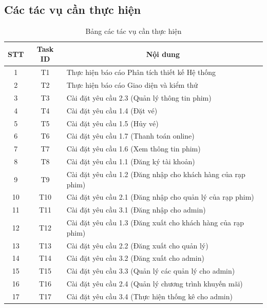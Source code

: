 \documentclass[a4paper, 12pt]{article}
\begin{document}
    \subsection{Các tác vụ cần thực hiện}
    \begin{table}[H]
        \begin{center}
            \begin{tabular}{|c|c|l|}
            \hline
            STT & Task ID & \multicolumn{1}{c|}{Nội dung}                               \\ \hline
            1   & T1      & Thực hiện báo cáo Phân tích thiết kế Hệ thống               \\ \hline
            2   & T2      & Thực hiện báo cáo Giao diện và kiểm thử                     \\ \hline
            3   & T3      & Cài đặt yêu cầu 2.3 (Quản lý thông tin phim)                \\ \hline
            4   & T4      & Cài đặt yêu cầu 1.4 (Đặt vé)                                \\ \hline
            5   & T5      & Cài đặt yêu cầu 1.5 (Hủy vé)                                \\ \hline
            6   & T6      & Cài đặt yêu cầu 1.7 (Thanh toán online)                     \\ \hline
            7   & T7      & Cài đặt yêu cầu 1.6 (Xem thông tin phim)                    \\ \hline
            8   & T8      & Cài đặt yêu cầu 1.1 (Đăng ký tài khoản)                     \\ \hline
            9   & T9      & Cài đặt yêu cầu 1.2 (Đăng nhập cho khách hàng của rạp phim) \\ \hline
            10  & T10     & Cài đặt yêu cầu 2.1 (Đăng nhập cho quản lý của rạp phim)    \\ \hline
            11  & T11     & Cài đặt yêu cầu 3.1 (Đăng nhập cho admin)                   \\ \hline
            12  & T12     & Cài đặt yêu cầu 1.3 (Đăng xuất cho khách hàng của rạp phim) \\ \hline
            13  & T13     & Cài đặt yêu cầu 2.2 (Đăng xuất cho quản lý)                 \\ \hline
            14  & T14     & Cài đặt yêu cầu 3.2 (Đăng xuất cho admin)                   \\ \hline
            15  & T15     & Cài đặt yêu cầu 3.3 (Quản lý các quản lý cho admin)         \\ \hline
            16  & T16     & Cài đặt yêu cầu 2.4 (Quản lý chương trình khuyến mãi)       \\ \hline
            17  & T17     & Cài đặt yêu cầu 3.4 (Thực hiện thống kê cho admin)          \\ \hline
            \end{tabular}
            \caption{Bảng các tác vụ cần thực hiện}
        \end{center}
    \end{table}
\end{document}
